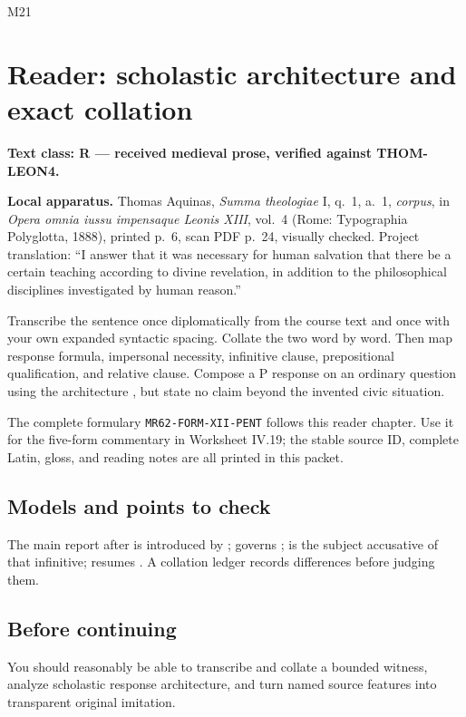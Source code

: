 \begin{courseunit}{M21}
\chapter{Reader: scholastic architecture and exact collation}

\textbf{Text class: R --- received medieval prose, verified against
THOM-LEON4.}

\ReaderThomasDoctrine

\textbf{Local apparatus.} Thomas Aquinas, \textit{Summa theologiae} I,
q.~1, a.~1, \textit{corpus}, in \textit{Opera omnia iussu impensaque Leonis
XIII}, vol.~4 (Rome: Typographia Polyglotta, 1888), printed p.~6, scan PDF
p.~24, visually checked.  Project translation: ``I answer that it was necessary
for human salvation that there be a certain teaching according to divine
revelation, in addition to the philosophical disciplines investigated by human
reason.''

Transcribe the sentence once diplomatically from the course text and once with
your own expanded syntactic spacing.  Collate the two word by word.  Then map
response formula, impersonal necessity, infinitive clause, prepositional
qualification, and relative clause.  Compose a P response on an ordinary
question using the architecture , but
state no claim beyond the invented civic situation.

The complete formulary \texttt{MR62-FORM-XII-PENT} follows this reader chapter.
Use it for the five-form commentary in Worksheet IV.19; the stable source ID,
complete Latin, gloss, and reading notes are all printed in this packet.

\ifsolutions
\section{Models and points to check}
The main report after  is introduced by ;
 governs ;  is the
subject accusative of that infinitive;  resumes
.  A collation ledger records differences before judging
them.
\else
\section{Before continuing}
You should reasonably be able to transcribe and collate a bounded witness,
analyze scholastic response architecture, and turn named source features into
transparent original imitation.
\fi
\end{courseunit}


